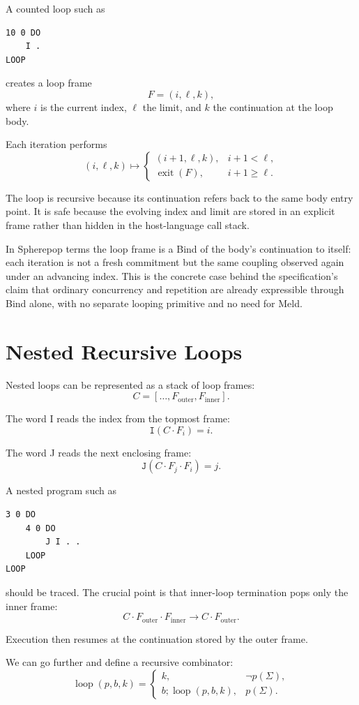 \documentclass[12pt]{article}
\begin{document}
A counted loop such as
\begin{lstlisting}
10 0 DO
    I .
LOOP
\end{lstlisting}
creates a loop frame
\[
F=(i,\ell,k),
\]
where \(i\) is the current index, \(\ell\) the limit, and \(k\) the continuation at the loop body.

Each iteration performs
\[
(i,\ell,k) \mapsto
\begin{cases}
(i+1,\ell,k), & i+1<\ell,\\
\operatorname{exit}(F), & i+1\geq\ell.
\end{cases}
\]

The loop is recursive because its continuation refers back to the same body entry point. It is safe because the evolving index and limit are stored in an explicit frame rather than hidden in the host-language call stack.

In Spherepop terms the loop frame is a Bind of the body's continuation to itself: each iteration is not a fresh commitment but the same coupling observed again under an advancing index. This is the concrete case behind the specification's claim that ordinary concurrency and repetition are already expressible through Bind alone, with no separate looping primitive and no need for Meld.

\section{Nested Recursive Loops}

Nested loops can be represented as a stack of loop frames:
\[
C = [\ldots,F_{\mathrm{outer}},F_{\mathrm{inner}}].
\]

The word I reads the index from the topmost frame:
\[
\texttt{I}(C\cdot F_i)=i.
\]

The word J reads the next enclosing frame:
\[
\texttt{J}(C\cdot F_j\cdot F_i)=j.
\]

A nested program such as
\begin{lstlisting}
3 0 DO
    4 0 DO
        J I . .
    LOOP
LOOP
\end{lstlisting}
should be traced. The crucial point is that inner-loop termination pops only the inner frame:
\[
C\cdot F_{\mathrm{outer}}\cdot F_{\mathrm{inner}} \longrightarrow C\cdot F_{\mathrm{outer}}.
\]

Execution then resumes at the continuation stored by the outer frame.

We can go further and define a recursive combinator:
\[
\operatorname{loop}(p,b,k) =
\begin{cases}
k, & \neg p(\Sigma),\\
b;\operatorname{loop}(p,b,k), & p(\Sigma).
\end{cases}
\]
\end{document}
